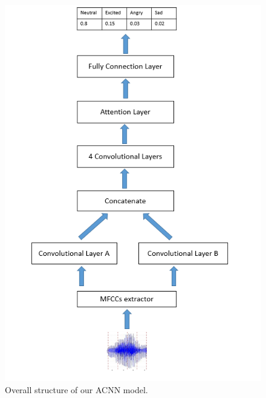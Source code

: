\documentclass[10pt, conference, compsocconf]{IEEEtran}
\begin{document}
\begin{figure}[h]
	\centering
	\includegraphics[width=0.95\linewidth]{pic/Model_Architecture}
	\caption{Overall structure of our ACNN model.}
	\label{model}
\end{figure}
\end{document}
